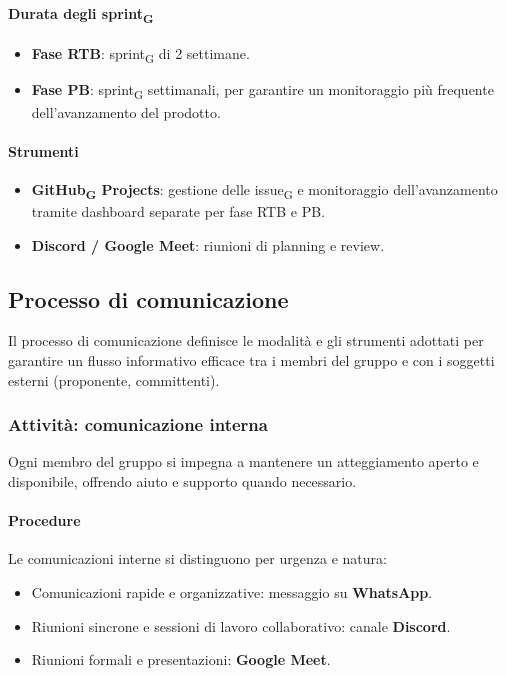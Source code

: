 \documentclass[11pt,a4paper]{article}
\newcommand{\gls}[1]{#1\textsubscript{G}}
\begin{document}
\paragraph{Durata degli \gls{sprint}}
\begin{itemize}
    \item \textbf{Fase RTB}: \gls{sprint} di 2 settimane.
    \item \textbf{Fase PB}: \gls{sprint} settimanali, per garantire un monitoraggio più frequente dell'avanzamento del prodotto.
\end{itemize}

\paragraph{Strumenti}
\begin{itemize}
    \item \textbf{\gls{GitHub} Projects}: gestione delle \gls{issue} e monitoraggio dell'avanzamento tramite dashboard separate per fase RTB e PB.
    \item \textbf{Discord / Google Meet}: riunioni di planning e review.
\end{itemize}

\subsection{Processo di comunicazione}
Il processo di comunicazione definisce le modalità e gli strumenti adottati
per garantire un flusso informativo efficace tra i membri del gruppo e con
i soggetti esterni (proponente, committenti).

\subsubsection{Attività: comunicazione interna}
Ogni membro del gruppo si impegna a mantenere un atteggiamento aperto e
disponibile, offrendo aiuto e supporto quando necessario.

\paragraph{Procedure}
Le comunicazioni interne si distinguono per urgenza e natura:
\begin{itemize}
    \item Comunicazioni rapide e organizzative: messaggio su \textbf{WhatsApp}.
    \item Riunioni sincrone e sessioni di lavoro collaborativo: canale
    \textbf{Discord}.
    \item Riunioni formali e presentazioni: \textbf{Google Meet}.
\end{itemize}
\end{document}
